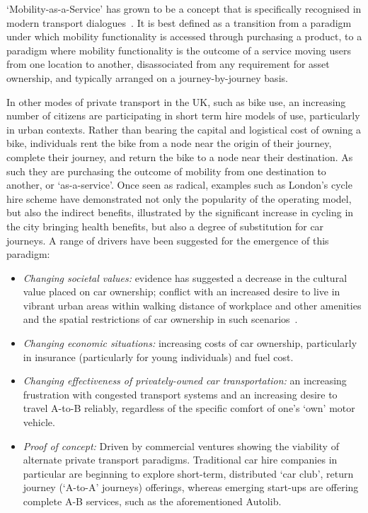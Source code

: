 \documentclass[b5paper,10pt]{article}
\begin{document}
`Mobility-as-a-Service' has grown to be a concept that is specifically
recognised in modern transport dialogues~\citep{tscatapult:2016}. It
is best defined as a transition from a paradigm under which mobility
functionality is accessed through purchasing a product, to a paradigm
where mobility functionality is the outcome of a service moving users
from one location to another, disassociated from any requirement for
asset ownership, and typically arranged on a journey-by-journey basis.

In other modes of private transport in the UK, such as bike use, an
increasing number of citizens are participating in short term hire
models of use, particularly in urban contexts. Rather than bearing the
capital and logistical cost of owning a bike, individuals rent the
bike from a node near the origin of their journey, complete their
journey, and return the bike to a node near their destination. As such
they are purchasing the outcome of mobility from one destination to
another, or `as-a-service'. Once seen as radical, examples such as
London's cycle hire scheme have demonstrated not only the popularity
of the operating model, but also the indirect benefits, illustrated by
the significant increase in cycling in the city bringing health
benefits, but also a degree of substitution for car journeys. A range
of drivers have been suggested for the emergence of this paradigm:

\begin{itemize}
\item {\emph{Changing societal values:}} evidence has
suggested a decrease in the cultural value placed on car ownership;
conflict with an increased desire to live in vibrant urban areas
within walking distance of workplace and other amenities and the
spatial restrictions of car ownership in such
scenarios~\citep{jenks+burgess:2011}.
\item {\emph{Changing economic situations:}} increasing costs of car
ownership, particularly in insurance (particularly for young
individuals) and fuel cost.
\item {\emph{Changing effectiveness of privately-owned car
transportation:}} an increasing frustration with congested transport
systems and an increasing desire to travel A-to-B reliably,
regardless of the specific comfort of one's `own' motor vehicle.
\item {\emph{Proof of concept:}} Driven by commercial ventures showing
the viability of alternate private transport paradigms. Traditional
car hire companies in particular are beginning to explore short-term,
distributed `car club', return journey (`A-to-A' journeys) offerings,
whereas emerging start-ups are offering complete A-B services, such as
the aforementioned Autolib.
\end{itemize}
\end{document}
